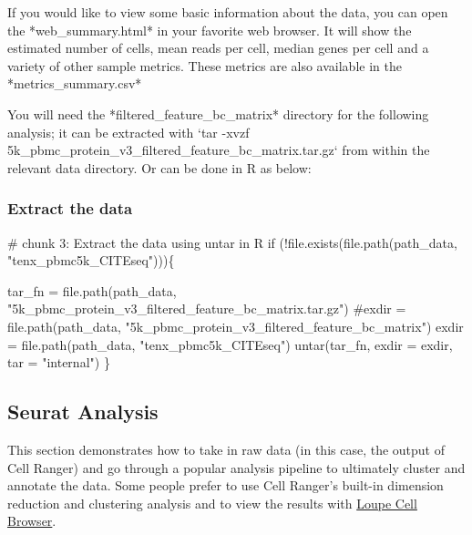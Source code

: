 \documentclass[
  letterpaper,
  DIV=11,
  numbers=noendperiod]{scrartcl}
\newenvironment{Shaded}{\begin{snugshade}}{\end{snugshade}}
\newcommand{\AttributeTok}[1]{\textcolor[rgb]{0.40,0.45,0.13}{#1}}
\newcommand{\CommentTok}[1]{\textcolor[rgb]{0.37,0.37,0.37}{#1}}
\newcommand{\ControlFlowTok}[1]{\textcolor[rgb]{0.00,0.23,0.31}{#1}}
\newcommand{\FunctionTok}[1]{\textcolor[rgb]{0.28,0.35,0.67}{#1}}
\newcommand{\NormalTok}[1]{\textcolor[rgb]{0.00,0.23,0.31}{#1}}
\newcommand{\OtherTok}[1]{\textcolor[rgb]{0.00,0.23,0.31}{#1}}
\newcommand{\SpecialCharTok}[1]{\textcolor[rgb]{0.37,0.37,0.37}{#1}}
\newcommand{\StringTok}[1]{\textcolor[rgb]{0.13,0.47,0.30}{#1}}
\begin{document}
If you would like to view some basic information about the data, you can
open the *web\_summary.html* in your favorite web browser. It will show
the estimated number of cells, mean reads per cell, median genes per
cell and a variety of other sample metrics. These metrics are also
available in the *metrics\_summary.csv*

You will need the *filtered\_feature\_bc\_matrix* directory for the
following analysis; it can be extracted with `tar -xvzf
5k\_pbmc\_protein\_v3\_filtered\_feature\_bc\_matrix.tar.gz` from within
the relevant data directory. Or can be done in R as below:

\hypertarget{extract-the-data}{%
\subsubsection{Extract the data}\label{extract-the-data}}

\begin{Shaded}
\begin{Highlighting}[]
\CommentTok{\# chunk 3: Extract the data using untar in R}
\ControlFlowTok{if}\NormalTok{ (}\SpecialCharTok{!}\FunctionTok{file.exists}\NormalTok{(}\FunctionTok{file.path}\NormalTok{(path\_data, }\StringTok{"tenx\_pbmc5k\_CITEseq"}\NormalTok{)))\{}

\NormalTok{tar\_fn }\OtherTok{=} \FunctionTok{file.path}\NormalTok{(path\_data, }\StringTok{"5k\_pbmc\_protein\_v3\_filtered\_feature\_bc\_matrix.tar.gz"}\NormalTok{)}
\CommentTok{\#exdir = file.path(path\_data, "5k\_pbmc\_protein\_v3\_filtered\_feature\_bc\_matrix")}
\NormalTok{exdir }\OtherTok{=} \FunctionTok{file.path}\NormalTok{(path\_data, }\StringTok{"tenx\_pbmc5k\_CITEseq"}\NormalTok{)}
\FunctionTok{untar}\NormalTok{(tar\_fn, }\AttributeTok{exdir =}\NormalTok{ exdir, }\AttributeTok{tar =} \StringTok{"internal"}\NormalTok{)}
\NormalTok{\}}
\end{Highlighting}
\end{Shaded}

\hypertarget{seurat-analysis}{%
\subsection{Seurat Analysis}\label{seurat-analysis}}

This section demonstrates how to take in raw data (in this case, the
output of Cell Ranger) and go through a popular analysis pipeline to
ultimately cluster and annotate the data. Some people prefer to use Cell
Ranger's built-in dimension reduction and clustering analysis and to
view the results with
\href{https://support.10xgenomics.com/single-cell-gene-expression/software/visualization/latest/what-is-loupe-cell-browser}{Loupe
Cell Browser}.
\end{document}
